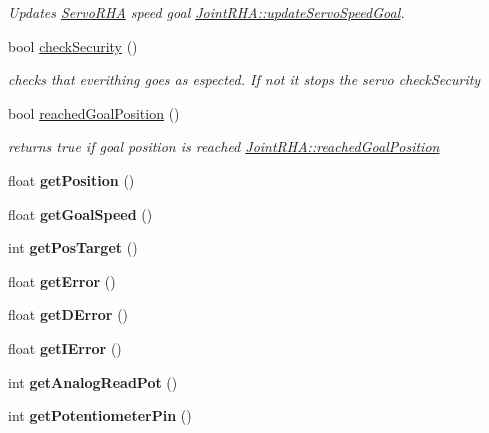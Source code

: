\begin{DoxyCompactItemize}
\begin{DoxyCompactList}\small\item\em Updates \hyperlink{classServoRHA}{Servo\+R\+HA} speed goal  \hyperlink{classJointRHA_a83d6397ce8495fcb6aa6c9c787029cb8}{Joint\+R\+H\+A\+::update\+Servo\+Speed\+Goal}. \end{DoxyCompactList}\item 
bool \hyperlink{classJointRHA_a456581be8bd7faa805e8d5d3ee39b38e}{check\+Security} ()
\begin{DoxyCompactList}\small\item\em checks that everithing goes as espected. If not it stops the servo  check\+Security \end{DoxyCompactList}\item 
bool \hyperlink{classJointRHA_af2624db0cab2521e52839e3304aa414d}{reached\+Goal\+Position} ()
\begin{DoxyCompactList}\small\item\em returns true if goal position is reached  \hyperlink{classJointRHA_af2624db0cab2521e52839e3304aa414d}{Joint\+R\+H\+A\+::reached\+Goal\+Position} \end{DoxyCompactList}\item 
float {\bfseries get\+Position} ()\hypertarget{classJointRHA_a520b57b3253406d8de4a93d7469b6033}{}\label{classJointRHA_a520b57b3253406d8de4a93d7469b6033}

\item 
float {\bfseries get\+Goal\+Speed} ()\hypertarget{classJointRHA_aec35bbee89ccc729d8120f3321ae7271}{}\label{classJointRHA_aec35bbee89ccc729d8120f3321ae7271}

\item 
int {\bfseries get\+Pos\+Target} ()\hypertarget{classJointRHA_ad43899febb44ecb4b96424d694b7f273}{}\label{classJointRHA_ad43899febb44ecb4b96424d694b7f273}

\item 
float {\bfseries get\+Error} ()\hypertarget{classJointRHA_ad6747315f3bd4bf5152658d2b6f142f1}{}\label{classJointRHA_ad6747315f3bd4bf5152658d2b6f142f1}

\item 
float {\bfseries get\+D\+Error} ()\hypertarget{classJointRHA_a4d0fdf0043ba63ca8ecca7f9ad391343}{}\label{classJointRHA_a4d0fdf0043ba63ca8ecca7f9ad391343}

\item 
float {\bfseries get\+I\+Error} ()\hypertarget{classJointRHA_a7d2bfb6a14f255ba66bedfba6dda3272}{}\label{classJointRHA_a7d2bfb6a14f255ba66bedfba6dda3272}

\item 
int {\bfseries get\+Analog\+Read\+Pot} ()\hypertarget{classJointRHA_a8317f8455c327eb85b547835125aaacf}{}\label{classJointRHA_a8317f8455c327eb85b547835125aaacf}

\item 
int {\bfseries get\+Potentiometer\+Pin} ()\hypertarget{classJointRHA_ae1a1cd062b222347eafc35ba507054f2}{}\label{classJointRHA_ae1a1cd062b222347eafc35ba507054f2}

\end{DoxyCompactItemize}
